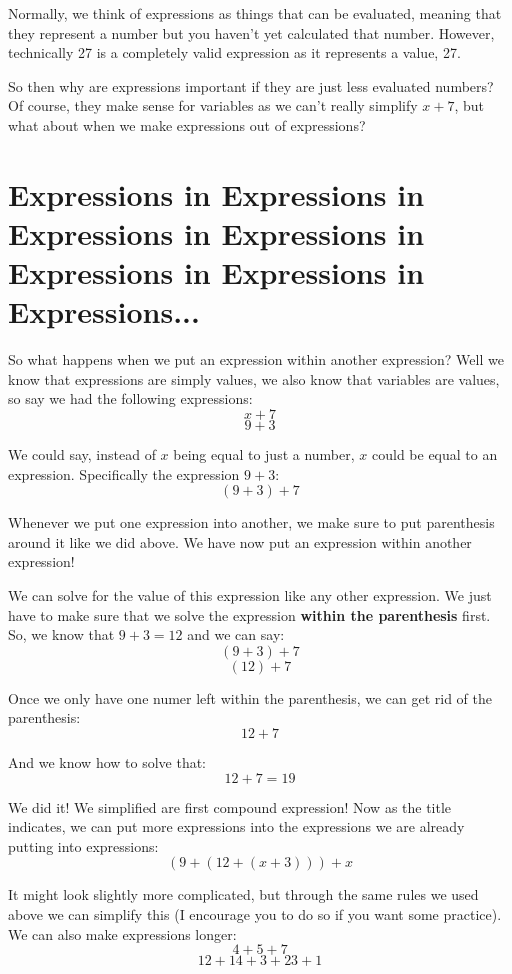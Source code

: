 \documentclass{article}
\begin{document}
Normally, we think of expressions as things that can be evaluated, meaning that they represent a number but you haven't yet calculated that number. However, technically 27 is a completely valid expression as it represents a value, 27. 

So then why are expressions important if they are just less evaluated numbers? Of course, they make sense for variables as we can't really simplify $x+7$, but what about when we make expressions out of expressions?

\section*{{Expressions} {\large in Expressions} {\normalsize in Expressions} {\small in Expressions} {\footnotesize in Expressions} {\scriptsize in Expressions} {\tiny in Expressions...} }

So what happens when we put an expression within another expression? Well we know that expressions are simply values, we also know that variables are values, so say we had the following expressions: 
\[ x + 7 \]
\[ 9+3 \]

We could say, instead of $x$ being equal to just a number, $x$ could be equal to an expression. Specifically the expression $9+3$:
\[ (9+3) + 7 \]

Whenever we put one expression into another, we make sure to put parenthesis around it like we did above. We have now put an expression within another expression! 

We can solve for the value of this expression like any other expression. We just have to make sure that we solve the expression \textbf{within the parenthesis} first. So, we know that $9+3=12$ and we can say: 
\[ (9+3) + 7 \]
\[ (12) + 7 \]

Once we only have one numer left within the parenthesis, we can get rid of the parenthesis:
\[ 12 +7 \]

And we know how to solve that: 
\[ 12 + 7 = 19 \]

We did it! We simplified are first compound expression! Now as the title indicates, we can put more expressions into the expressions we are already putting into expressions:
\[ (9+ (12 + (x + 3))) + x \]

It might look slightly more complicated, but through the same rules we used above we can simplify this (I encourage you to do so if you want some practice). We can also make expressions longer:
\[ 4 + 5 + 7 \]
\[ 12 + 14 + 3 + 23 + 1 \]
\end{document}
